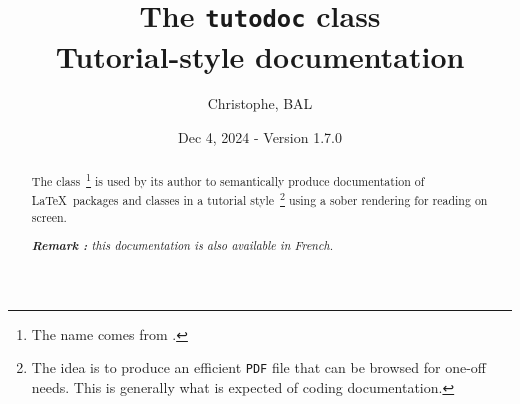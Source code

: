 \title{The \texttt{tutodoc} class \\ Tutorial-style documentation}
\author{Christophe, BAL}
\date{Dec 4, 2024 - Version 1.7.0}

\maketitle

\begin{abstract}
    The \thisproj{} class\,%
    \footnote{
        The name comes from .
    }
    is used by its author to semantically produce documentation of \LaTeX\ packages and classes in a tutorial style\,%
    \footnote{
        The idea is to produce an efficient \texttt{PDF} file that can be browsed for one-off needs. This is generally what is expected of coding documentation.
    }
    using a sober rendering for reading on screen.

    \smallskip

    \noindent
    \emph{\textbf{Remark :} this documentation is also available in French.}
\end{abstract}

\tdocsep

